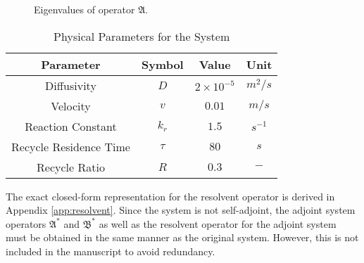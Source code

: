 \begin{figure}[!htbp]
    \centering
    
    \caption{Eigenvalues of operator $\mathfrak{A}$.}
    \label{fig:eigval_dist}
\end{figure}
\begin{table}[ht]
    \centering
    \caption{Physical Parameters for the System}
    \label{tab:pars}
    \begin{tabular}{|c|c|c|c|}
    \hline
    \textbf{Parameter}        & \textbf{Symbol} & \textbf{Value}     & \textbf{Unit}    \\ \hline
    Diffusivity               & $D$             & $2\times10^{-5}$   & ${m^2}/{s}$      \\ \hline
    Velocity                  & $v$             & $0.01$   & ${m}/{s}$        \\ \hline
    Reaction Constant         & $k_r$           & $1.5$              & $s^{-1}$         \\ \hline
    Recycle Residence Time    & $\tau$          & $80$               & $s$              \\ \hline
    Recycle Ratio             & $R$             & $0.3$              & $-$              \\ \hline
    \end{tabular}
\end{table}

The exact closed-form representation for the resolvent operator is derived in Appendix \ref{app:resolvent}. Since the system is not self-adjoint, the adjoint system operators $\mathfrak{A}^*$ and $\mathfrak{B}^*$ as well as the resolvent operator for the adjoint system must be obtained in the same manner as the original system. However, this is not included in the manuscript to avoid redundancy.